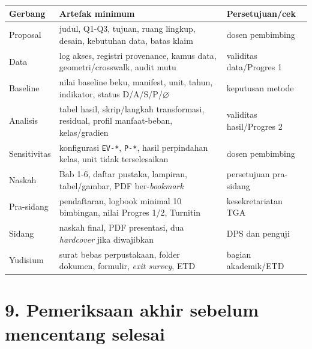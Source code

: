 \documentclass[
  indonesian,
  11pt,
]{article}
\newcounter{none} %
\begin{document}
{\def\LTcaptype{none} %
\begin{longtable}[]{@{}
  >{\raggedright\arraybackslash}p{}
  >{\raggedright\arraybackslash}p{}
  >{\raggedright\arraybackslash}p{}@{}}
\toprule\noalign{}
\begin{minipage}[b]{\linewidth}\raggedright
Gerbang
\end{minipage} & \begin{minipage}[b]{\linewidth}\raggedright
Artefak minimum
\end{minipage} & \begin{minipage}[b]{\linewidth}\raggedright
Persetujuan/cek
\end{minipage} \\
\midrule\noalign{}
\endhead
\bottomrule\noalign{}
\endlastfoot
Proposal & judul, Q1-Q3, tujuan, ruang lingkup, desain, kebutuhan data,
batas klaim & dosen pembimbing \\
Data & log akses, registri provenance, kamus data, geometri/crosswalk,
audit mutu & validitas data/Progres 1 \\
Baseline & nilai baseline beku, manifest, unit, tahun, indikator, status
D/A/S/P/\(\varnothing\) & keputusan metode \\
Analisis & tabel hasil, skrip/langkah transformasi, residual, profil
manfaat-beban, kelas/gradien & validitas hasil/Progres 2 \\
Sensitivitas & konfigurasi \texttt{EV-*}, \texttt{P-*}, hasil
perpindahan kelas, unit tidak terselesaikan & dosen pembimbing \\
Naskah & Bab 1-6, daftar pustaka, lampiran, tabel/gambar, PDF
ber-\emph{bookmark} & persetujuan pra-sidang \\
Pra-sidang & pendaftaran, logbook minimal 10 bimbingan, nilai Progres
1/2, Turnitin & kesekretariatan TGA \\
Sidang & naskah final, PDF presentasi, dua \emph{hardcover} jika
diwajibkan & DPS dan penguji \\
Yudisium & surat bebas perpustakaan, folder dokumen, formulir,
\emph{exit survey}, ETD & bagian akademik/ETD \\
\end{longtable}
}

\section{9. Pemeriksaan akhir sebelum mencentang
selesai}\label{pemeriksaan-akhir-sebelum-mencentang-selesai}
\end{document}
